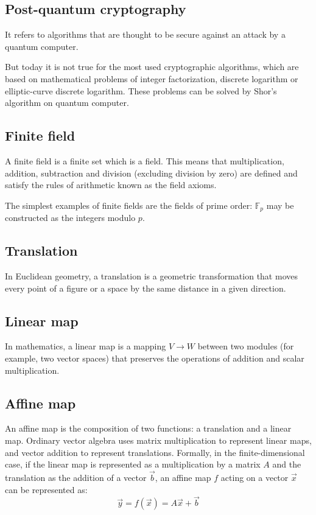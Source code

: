 \documentclass[thesis=M,english]{FITthesis}[2019/12/23]
\begin{document}
\subsection{Post-quantum cryptography}
It refers to algorithms that are thought to be secure against an attack by a quantum computer.

But today it is not true for the most used cryptographic algorithms, which are based on mathematical problems of integer factorization, discrete logarithm or elliptic-curve discrete logarithm. These problems can be solved by Shor's algorithm on quantum computer.

\subsection{Finite field}
A finite field is a finite set which is a field. This means that multiplication, addition, subtraction and division (excluding division by zero) are defined and satisfy the rules of arithmetic known as the field axioms.

The simplest examples of finite fields are the fields of prime order: $\mathbb {F}_{p}$ may be constructed as the integers modulo $p$.

\subsection{Translation}
In Euclidean geometry, a translation is a geometric transformation that moves every point of a figure or a space by the same distance in a given direction.

\subsection{Linear map}
In mathematics, a linear map is a mapping $V \rightarrow W$ between two modules (for example, two vector spaces) that preserves the operations of addition and scalar multiplication.

\subsection{Affine map}
An affine map is the composition of two functions: a translation and a linear map. Ordinary vector algebra uses matrix multiplication to represent linear maps, and vector addition to represent translations. Formally, in the finite-dimensional case, if the linear map is represented as a multiplication by a matrix $A$ and the translation as the addition of a vector $\vec {b}$, an affine map $f$ acting on a vector ${\vec {x}}$ can be represented as:
\[
{\vec {y}}=f({\vec {x}})=A{\vec {x}}+{\vec {b}}
\]
\end{document}
